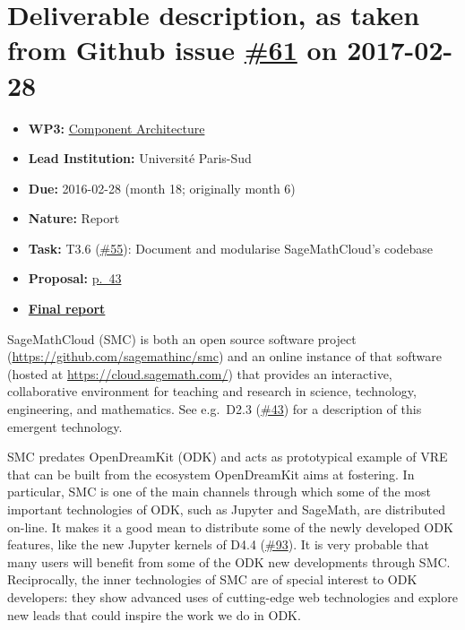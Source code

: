 \section*{\texorpdfstring{Deliverable description, as taken from Github
issue
\href{https://github.com/OpenDreamKit/OpenDreamKit/issues/61}{\#61} on
2017-02-28}{Deliverable description, as taken from Github issue \#61 on 2017-02-28}}\label{deliverable-description-as-taken-from-github-issue-61-on-2017-02-28}

\begin{itemize}
\tightlist
\item
  \textbf{WP3:}
  \href{https://github.com/OpenDreamKit/OpenDreamKit/tree/master/WP3}{Component
  Architecture}
\item
  \textbf{Lead Institution:} Université Paris-Sud
\item
  \textbf{Due:} 2016-02-28 (month 18; originally month 6)
\item
  \textbf{Nature:} Report
\item
  \textbf{Task:} T3.6
  (\href{https://github.com/OpenDreamKit/OpenDreamKit/issues/55}{\#55}):
  Document and modularise SageMathCloud's codebase
\item
  \textbf{Proposal:}
  \href{https://github.com/OpenDreamKit/OpenDreamKit/raw/master/Proposal/proposal-www.pdf}{p.~43}
\item
  \textbf{\href{https://github.com/OpenDreamKit/OpenDreamKit/raw/master/WP3/D3.2/report-final.pdf}{Final
  report}}
\end{itemize}

SageMathCloud (SMC) is both an open source software project
(\url{https://github.com/sagemathinc/smc}) and an online instance of
that software (hosted at \url{https://cloud.sagemath.com/}) that
provides an interactive, collaborative environment for teaching and
research in science, technology, engineering, and mathematics. See
e.g.~D2.3
(\href{https://github.com/OpenDreamKit/OpenDreamKit/issues/43}{\#43})
for a description of this emergent technology.

SMC predates OpenDreamKit (ODK) and acts as prototypical example of VRE
that can be built from the ecosystem OpenDreamKit aims at fostering. In
particular, SMC is one of the main channels through which some of the
most important technologies of ODK, such as Jupyter and SageMath, are
distributed on-line. It makes it a good mean to distribute some of the
newly developed ODK features, like the new Jupyter kernels of D4.4
(\href{https://github.com/OpenDreamKit/OpenDreamKit/issues/93}{\#93}).
It is very probable that many users will benefit from some of the ODK
new developments through SMC. Reciprocally, the inner technologies of
SMC are of special interest to ODK developers: they show advanced uses
of cutting-edge web technologies and explore new leads that could
inspire the work we do in ODK.

